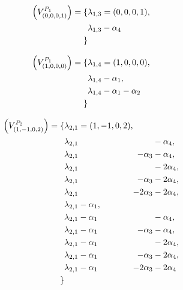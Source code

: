 \documentclass[uplatex,dvipdfmx]{jsarticle}
\begin{document}
\begin{equation}
    \begin{alignedat}
        \Delta\left( V^{P_1}_{(0, 0, 0, 1)} \right)
        =
        \{
            &\lambda_{1,3} = (0, 0, 0, 1), \\
            &\lambda_{1,3} - \alpha_4\\
        \}
    \end{alignedat}
\end{equation}

\begin{equation}
    \begin{alignedat}
        \Delta\left( V^{P_1}_{(1, 0, 0, 0)} \right)
        =
        \{
            &\lambda_{1,4} = (1, 0, 0, 0), \\
            &\lambda_{1,4} - \alpha_1,\\
            &\lambda_{1,4} - \alpha_1 - \alpha_2\\
        \}
    \end{alignedat}
\end{equation}

\begin{equation}
    \begin{alignedat}
        \Delta\left( V^{P_2}_{(1, -1, 0, 2)} \right)
        =
        \{
            &\lambda_{2,1} = (1, -1, 0, 2),\\
            &\lambda_{2,1} &&- \alpha_4,\\
            &\lambda_{2,1} &- \alpha_3 &-\alpha_4,\\
            &\lambda_{2,1} &&- 2\alpha_4,\\
            &\lambda_{2,1} &- \alpha_3 &- 2\alpha_4,\\
            &\lambda_{2,1} &- 2\alpha_3 &- 2\alpha_4,\\
            &\lambda_{2,1} - \alpha_1,\\
            &\lambda_{2,1} - \alpha_1 &&- \alpha_4,\\
            &\lambda_{2,1} - \alpha_1 &- \alpha_3 &-\alpha_4,\\
            &\lambda_{2,1} - \alpha_1 &&- 2\alpha_4,\\
            &\lambda_{2,1} - \alpha_1 &- \alpha_3 &- 2\alpha_4,\\
            &\lambda_{2,1} - \alpha_1 &- 2\alpha_3 &- 2\alpha_4\\
        \}
    \end{alignedat}
\end{equation}
\end{document}
